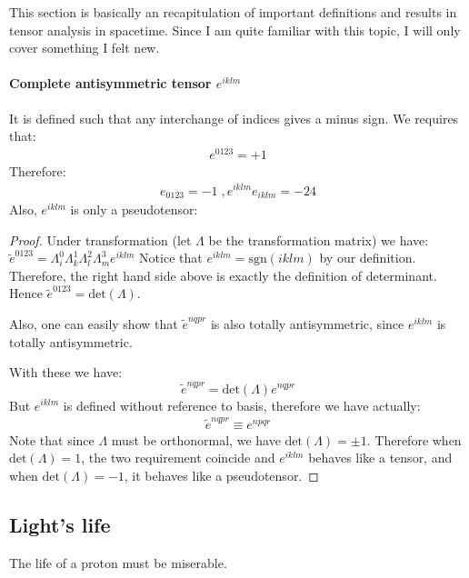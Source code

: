 \documentclass{article}
\numberwithin{equation}{subsection} %
\theoremstyle{definition}
\begin{document}
    This section is basically an recapitulation of important definitions
    and results in tensor analysis in spacetime. Since I am quite
    familiar with this topic, I will only cover something I felt new.

    \paragraph{Complete antisymmetric tensor $e^{iklm}$}
    It is defined such that any interchange of indices gives a minus
    sign. We requires that:
    \begin{align}
        e^{0123}= +1
    \end{align}
    Therefore:
    \begin{align*}
        e_{0123}= -1\;, e^{iklm}e_{iklm}= -24
    \end{align*}
    Also, $e^{iklm}$ is only a pseudotensor:
    \begin{proof}
        Under transformation (let $\Lambda$ be the transformation matrix)
        we have:
        $\tilde{e}^{0123}=
          \Lambda^{0}_{i}\Lambda^{1}_{k}\Lambda^{2}_{l}\Lambda^{3}_{m}
          e^{iklm}$
        Notice that $e^{iklm}=\mathrm{sgn}(iklm)$ by our definition.
        Therefore, the right hand side above is exactly the definition
        of determinant. Hence $\tilde{e}^{0123}=\mathrm{det}(\Lambda)$.

        Also, one can easily show that $\tilde{e}^{nqpr}$ is also
        totally antisymmetric, since $e^{iklm}$ is totally antisymmetric.

        With these we have:
        $$
            \tilde{e}^{nqpr}=\mathrm{det}(\Lambda)e^{nqpr}
        $$
        But $e^{iklm}$ is defined without reference to basis, therefore
        we have actually:
        \begin{align}
            \tilde{e}^{nqpr} \equiv e^{npqr}
        \end{align}
        Note that since $\Lambda$ must be orthonormal, we have 
        $\mathrm{det}(\Lambda)=\pm 1$. Therefore when
        $\mathrm{det}(\Lambda)=1$, the two requirement coincide and
        $e^{iklm}$ behaves like a tensor, and when 
        $\mathrm{det}(\Lambda)=-1$, it behaves like a pseudotensor.
    \end{proof}
    
    \subsection{Light's life}
    \label{sec:Lights_life}
    The life of a proton must be miserable.
    
\end{document}
